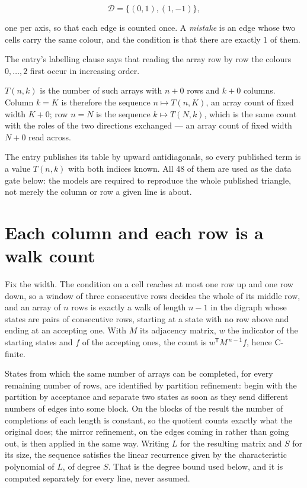 \documentclass[11pt]{article}
\theoremstyle{definition}
\begin{document}
\[\mathcal{D} = \{(0,1), (1,-1)\},\]

one per axis, so that each edge is counted once. A {\itshape mistake} is an edge whose two cells carry the same colour, and the condition is that there are exactly $1$ of them.

The entry's labelling clause says that reading the array row by row the colours $0,\dots,2$ first occur in increasing order.

$T(n,k)$ is the number of such arrays with $n + 0$ rows and $k + 0$ columns. Column $k = K$ is therefore the sequence $n \mapsto T(n,K)$, an array count of fixed width $K + 0$; row $n = N$ is the sequence $k \mapsto T(N,k)$, which is the same count with the roles of the two directions exchanged --- an array count of fixed width $N + 0$ read across.

The entry publishes its table by upward antidiagonals, so every published term is a value $T(n,k)$ with both indices known. All 48 of them are used as the data gate below: the models are required to reproduce the whole published triangle, not merely the column or row a given line is about.

\section{Each column and each row is a walk count}

Fix the width. The condition on a cell reaches at most one row up and one row down, so a window of three consecutive rows decides the whole of its middle row, and an array of $n$ rows is exactly a walk of length $n-1$ in the digraph whose states are pairs of consecutive rows, starting at a state with no row above and ending at an accepting one. With $M$ its adjacency matrix, $w$ the indicator of the starting states and $f$ of the accepting ones, the count is $w^{\mathsf T}M^{\,n-1}f$, hence C-finite.

States from which the same number of arrays can be completed, for every remaining number of rows, are identified by partition refinement: begin with the partition by acceptance and separate two states as soon as they send different numbers of edges into some block. On the blocks of the result the number of completions of each length is constant, so the quotient counts exactly what the original does; the mirror refinement, on the edges coming in rather than going out, is then applied in the same way. Writing $L$ for the resulting matrix and $S$ for its size, the sequence satisfies the linear recurrence given by the characteristic polynomial of $L$, of degree $S$. That is the degree bound used below, and it is computed separately for every line, never assumed.
\end{document}
